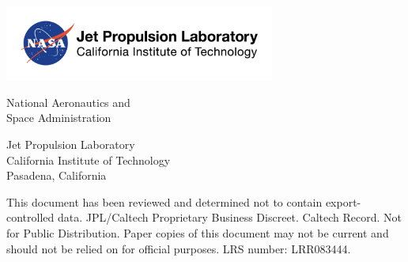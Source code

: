 \makeatletter %
\begin{titlepage}
    \parindent0pt
    \vspace*{1cm}

    \includegraphics[width=3.5in]{fig/nasa-jpl-logo}

    \Huge
    \textbf{\@title}

    \vfill
    \Large

    \adtversionname

    \@date

    \vspace{0.5cm}

    \@author

    \vfill

    \footnotesize
    National Aeronautics and\\
    Space Administration

    Jet Propulsion Laboratory \\
    California Institute of Technology \\
    Pasadena, California

    \vfill
    {\footnotesize This document has been reviewed and determined not to contain export-controlled data. JPL/Caltech Proprietary Business Discreet. Caltech Record. Not for Public Distribution. Paper copies of this document may not be current and should not be relied on for official purposes. LRS number: LRR083444.}
    \thispagestyle{empty}

\end{titlepage}
\makeatother
